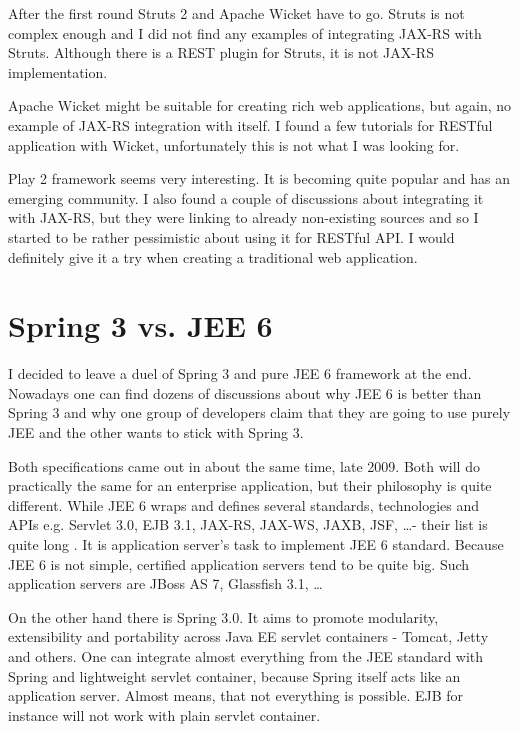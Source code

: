 	After the first round Struts 2 and Apache Wicket have to go. Struts is not complex enough and I did not find any
	examples of integrating JAX-RS with Struts. Although there is a REST plugin for Struts, it is not JAX-RS implementation.
	
	Apache Wicket might be suitable for creating rich web applications, but again, no example of JAX-RS integration with
	itself. I found a few tutorials for RESTful application with Wicket, unfortunately this is not what I was looking for.
	
	Play 2 framework seems very interesting. It is becoming quite popular and has an emerging community. I also
	found a couple of discussions about integrating it with JAX-RS, but they were linking to already non-existing sources
	and so I started to be rather pessimistic about using it for RESTful API. I would definitely give it a try when
	creating a traditional web application.
	
	\section{Spring 3 vs. JEE 6}
	
	I decided to leave a duel of Spring 3 and pure JEE 6 framework at the end. Nowadays one can find dozens of discussions
	about why JEE 6 is better than Spring 3 and why one group of developers claim that they are going to use purely JEE and
	the other wants to stick with Spring 3.
	
	Both specifications came out in about the same time, late 2009. Both will do practically the same for an enterprise
	application, but their philosophy is quite different. While JEE 6 wraps and defines several standards, technologies and
	APIs e.g. Servlet 3.0, EJB 3.1, JAX-RS, JAX-WS, JAXB, JSF, \ldots  - their list is quite long \cite{oracle_jee}. It is
	application server's task to implement JEE 6 standard. Because JEE 6 is not simple, certified application servers
	tend to be quite big. Such application servers are JBoss AS 7, Glassfish 3.1, \ldots
	
	On the other hand there is Spring 3.0. It aims to promote modularity, extensibility and portability across Java EE
	servlet containers - Tomcat, Jetty and others. One can integrate almost everything from the JEE standard with Spring
	and lightweight servlet container, because Spring itself acts like an application server. Almost means, that not
	everything is possible. EJB for instance will not work with plain servlet container.
	
